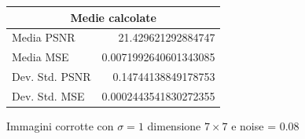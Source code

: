 \begin{figure}[H]
\begin{minipage}[h]{0.4\textwidth}
{\begin{tabular}{|lr|}
            \multicolumn{2}{|c|}{\textbf{Medie calcolate}} \\ \hline
            Media PSNR           & 21.429621292884747         \\
            Media MSE            & 0.0071992640601343085     \\
            Dev. Std. PSNR       & 0.14744138849178753         \\
            Dev. Std. MSE        & 0.0002443541830272355     \\ \hline
            \end{tabular}
        }
    \end{minipage}
    \captionsetup{labelformat=andtable}
    \caption{Immagini corrotte con $\sigma = 1$ dimensione $7 \times 7$ e noise = 0.08}
\end{figure}

